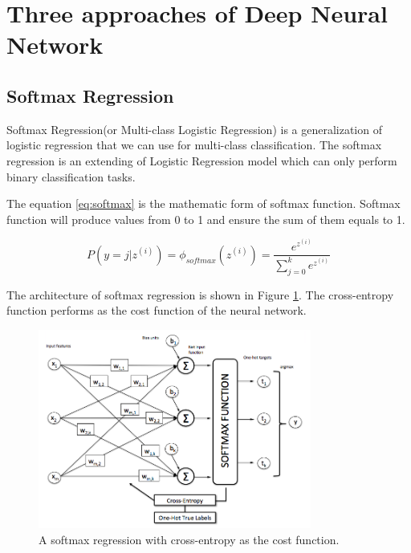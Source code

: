 \documentclass[article]{aaltoseries}
\begin{document}
\section{Three approaches of Deep Neural Network}
\label{sec:approaches}

\subsection{Softmax Regression}



Softmax Regression(or Multi-class Logistic Regression) is a generalization of logistic regression 
that we can use for multi-class classification.
The softmax regression is an extending of Logistic Regression model which can only perform binary classification tasks.

The equation \ref{eq:softmax} is the mathematic form of softmax function. Softmax function will produce values from 0 to 1
and ensure the sum of them equals to 1. 

\begin{equation}
\label{eq:softmax}
 P(y=j|z^{(i)} )= \phi_{softmax} (z^{(i)}) = \frac{ e ^{z^{(i)}}}{\sum_{j=0}^k e ^{z^{(i)}}}  
\end{equation}

The architecture of softmax regression is shown in Figure \ref{fig:softmax_regression}. 
The cross-entropy function\cite{crossEntropy2005} performs as the cost function of the neural network.

\begin{figure}[t!]
  \begin{center}
    \includegraphics[width=0.8\textwidth]{figures/softmax_regression_schematic}
    \caption{A softmax regression with cross-entropy as the cost function.}
    \label{fig:softmax_regression}
  \end{center}
\end{figure}
\end{document}
